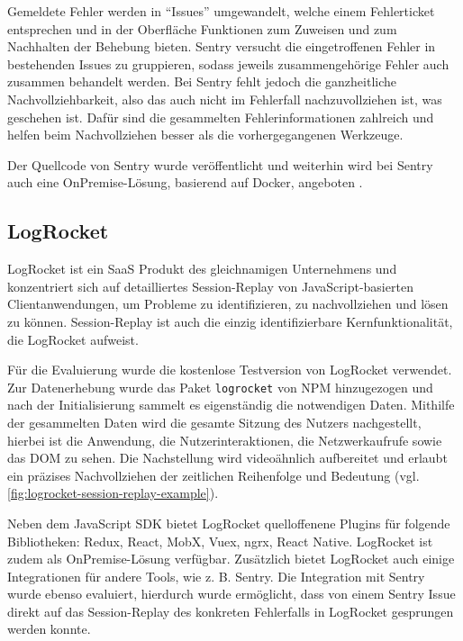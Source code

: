 Gemeldete Fehler werden in \enquote{Issues} umgewandelt, welche einem Fehlerticket entsprechen und in der Oberfläche Funktionen zum Zuweisen und zum Nachhalten der Behebung bieten. Sentry versucht die eingetroffenen Fehler in bestehenden Issues zu gruppieren, sodass jeweils zusammengehörige Fehler auch zusammen behandelt werden. Bei Sentry fehlt jedoch die ganzheitliche Nachvollziehbarkeit, also das auch nicht im Fehlerfall nachzuvollziehen ist, was geschehen ist. Dafür sind die gesammelten Fehlerinformationen zahlreich und helfen beim Nachvollziehen besser als die vorhergegangenen Werkzeuge.

Der Quellcode von Sentry wurde veröffentlicht und weiterhin wird bei Sentry auch eine OnPremise-Lösung, basierend auf Docker, angeboten \cite{SentrySelfHosted}.

\subsection{LogRocket}

LogRocket \cite{LogRocket} ist ein SaaS Produkt des gleichnamigen Unternehmens und konzentriert sich auf detailliertes Session-Replay von JavaScript-basierten Clientanwendungen, um Probleme zu identifizieren, zu nachvollziehen und lösen zu können. Session-Replay ist auch die einzig identifizierbare Kernfunktionalität, die LogRocket aufweist.

Für die Evaluierung wurde die kostenlose Testversion von LogRocket verwendet. Zur Datenerhebung wurde das Paket \texttt{logrocket} von NPM hinzugezogen und nach der Initialisierung sammelt es eigenständig die notwendigen Daten. Mithilfe der gesammelten Daten wird die gesamte Sitzung des Nutzers nachgestellt, hierbei ist die Anwendung, die Nutzerinteraktionen, die Netzwerkaufrufe sowie das DOM zu sehen. Die Nachstellung wird videoähnlich aufbereitet und erlaubt ein präzises Nachvollziehen der zeitlichen Reihenfolge und Bedeutung (vgl. \autoref{fig:logrocket-session-replay-example}).

Neben dem JavaScript SDK bietet LogRocket quelloffenene Plugins für folgende Bibliotheken: Redux, React, MobX, Vuex, ngrx, React Native. LogRocket ist zudem als OnPremise-Lösung verfügbar. Zusätzlich bietet LogRocket auch einige Integrationen für andere Tools, wie z. B. Sentry. Die Integration mit Sentry wurde ebenso evaluiert, hierdurch wurde ermöglicht, dass von einem Sentry Issue direkt auf das Session-Replay des konkreten Fehlerfalls in LogRocket gesprungen werden konnte.

